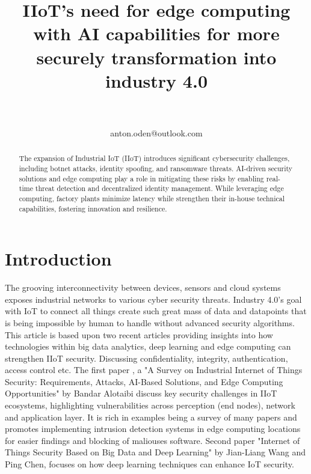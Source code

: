 \documentclass[article,a4paper]{IEEEtran}
\title{IIoT's need for edge computing with AI capabilities for more securely transformation into industry 4.0}
\author{
\IEEEauthorblockN{Anton Odén}\\
\IEEEauthorblockA{Dept. of Maths and Computer Science\\Karlstad University\\
651 88 KARLSTAD, Sweden}\\
anton.oden@outlook.com
}
\begin{document}
\maketitle

\begin{abstract}
    The expansion of Industrial IoT (IIoT) introduces significant cybersecurity challenges, including botnet attacks, identity spoofing, and ransomware threats. AI-driven security solutions and edge computing play a role in mitigating these risks by enabling real-time threat detection and decentralized identity management. While leveraging edge computing, factory plants minimize latency while strengthen their in-house technical capabilities, fostering innovation and resilience.
\end{abstract}

\tableofcontents

\section{Introduction}
The grooving interconnectivity between devices, sensors and cloud systems exposes industrial networks to various cyber security threats. Industry 4.0's goal with IoT to connect all things create such great mass of data and datapoints that is being impossible by human to handle without advanced security algorithms. This article is based upon two recent articles providing insights into how technologies within big data analytics, deep learning and edge computing can strengthen IIoT security. Discussing confidentiality, integrity, authentication, access control etc.     
\newline\newline
The first paper \cite{SurveySecurity}, a "A Survey on Industrial Internet of Things Security: Requirements, Attacks, AI-Based Solutions, and Edge Computing Opportunities" by Bandar Alotaibi discuss key security challenges in IIoT ecosystems, highlighting vulnerabilities across perception (end nodes), network and application layer. It is rich in examples being a survey of many papers and promotes implementing intrusion detection systems in edge computing locations for easier findings and blocking of maliouses software.   
\newline\newline
Second paper \cite{Deeplearning} "Internet of Things Security Based on Big Data and Deep Learning" by Jian-Liang Wang and Ping Chen, focuses on how deep learning techniques can enhance IoT security. 
\end{document}
